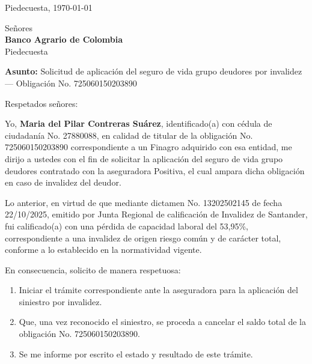 \documentclass[11pt]{article}
\begin{document}
\noindent Piedecuesta, \today

\vspace{0.8cm}

\noindent Señores\\
\textbf{Banco Agrario de Colombia}\\{}
Piedecuesta

\vspace{0.6cm}

\noindent \textbf{Asunto:} Solicitud de aplicación del seguro de vida grupo deudores por invalidez --- Obligación No. 725060150203890

\vspace{0.6cm}

\noindent Respetados señores:

\vspace{0.3cm}

\noindent Yo, \textbf{Maria del Pilar Contreras Suárez}, identificado(a) con cédula de ciudadanía No. 27880088, en calidad de titular de la obligación No. 725060150203890 correspondiente a un Finagro adquirido con esa entidad, me dirijo a ustedes con el fin de solicitar la aplicación del seguro de vida grupo deudores contratado con la aseguradora Positiva, el cual ampara dicha obligación en caso de invalidez del deudor.

\vspace{0.3cm}

\noindent Lo anterior, en virtud de que mediante dictamen No. 13202502145 de fecha 22/10/2025, emitido por Junta Regional de calificación de Invalidez de Santander, fui calificado(a) con una pérdida de capacidad laboral del 53,95\%, correspondiente a una invalidez de origen riesgo común y de carácter total, conforme a lo establecido en la normatividad vigente.

\vspace{0.3cm}

\noindent En consecuencia, solicito de manera respetuosa:

\begin{enumerate}
    \item Iniciar el trámite correspondiente ante la aseguradora para la aplicación del siniestro por invalidez.
    \item Que, una vez reconocido el siniestro, se proceda a cancelar el saldo total de la obligación No. 725060150203890.
    \item Se me informe por escrito el estado y resultado de este trámite.
\end{enumerate}
\end{document}

